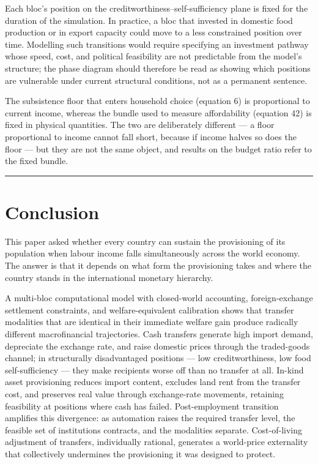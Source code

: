 \documentclass[preprint,review,12pt]{elsarticle}
\begin{document}
Each bloc's position on the creditworthiness--self-sufficiency plane is
fixed for the duration of the simulation. In practice, a bloc that
invested in domestic food production or in export capacity could move to
a less constrained position over time. Modelling such transitions would
require specifying an investment pathway whose speed, cost, and
political feasibility are not predictable from the model's structure;
the phase diagram should therefore be read as showing which positions
are vulnerable under current structural conditions, not as a permanent
sentence.

The subsistence floor that enters household choice (equation 6) is
proportional to current income, whereas the bundle used to measure
affordability (equation 42) is fixed in physical quantities. The two are
deliberately different --- a floor proportional to income cannot fall
short, because if income halves so does the floor --- but they are not
the same object, and results on the budget ratio refer to the fixed
bundle.

\begin{center}\rule{0.5\linewidth}{0.5pt}\end{center}

\section{Conclusion}

This paper asked whether every country can sustain the provisioning of
its population when labour income falls simultaneously across the world
economy. The answer is that it depends on what form the provisioning
takes and where the country stands in the international monetary
hierarchy.

A multi-bloc computational model with closed-world accounting,
foreign-exchange settlement constraints, and welfare-equivalent
calibration shows that transfer modalities that are identical in their
immediate welfare gain produce radically different macrofinancial
trajectories. Cash transfers generate high import demand, depreciate the
exchange rate, and raise domestic prices through the traded-goods
channel; in structurally disadvantaged positions --- low
creditworthiness, low food self-sufficiency --- they make recipients
worse off than no transfer at all. In-kind asset provisioning reduces
import content, excludes land rent from the transfer cost, and preserves
real value through exchange-rate movements, retaining feasibility at
positions where cash has failed. Post-employment transition amplifies
this divergence: as automation raises the required transfer level, the
feasible set of institutions contracts, and the modalities separate.
Cost-of-living adjustment of transfers, individually rational, generates
a world-price externality that collectively undermines the provisioning
it was designed to protect.
\end{document}

